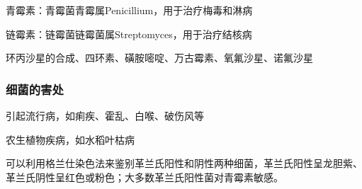 \begin{notation}
    青霉素：青霉菌青霉属Penicillium，用于治疗梅毒和淋病
\end{notation}
\begin{notation}
    链霉素：链霉菌链霉菌属Streptomyces，用于治疗结核病
\end{notation}
\begin{notation}
环丙沙星的合成、四环素、磺胺嘧啶、万古霉素、氧氟沙星、诺氟沙星
\end{notation}
\subsubsection*{细菌的害处}%
\label{subsub*:细菌的害处}
\begin{notation}
    引起流行病，如痢疾、霍乱、白喉、破伤风等
\end{notation}
\begin{notation}
    农生植物疾病，如水稻叶枯病
\end{notation}
可以利用格兰仕染色法来鉴别革兰氏阳性和阴性两种细菌，革兰氏阳性呈龙胆紫、革兰氏阴性呈红色或粉色；大多数革兰氏阳性菌对青霉素敏感。
